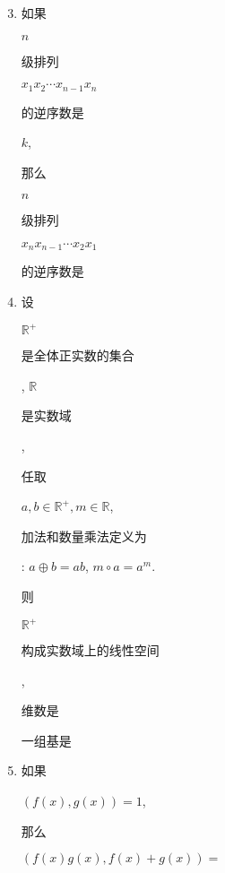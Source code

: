 \documentclass[10pt]{article}
\begin{document}
\begin{enumerate}
  \setcounter{enumi}{2}
  \item \begin{CJK}{UTF8}{mj}如果\end{CJK} $n$ \begin{CJK}{UTF8}{mj}级排列\end{CJK} $x_{1} x_{2} \cdots x_{n-1} x_{n}$ \begin{CJK}{UTF8}{mj}的逆序数是\end{CJK} $k$, \begin{CJK}{UTF8}{mj}那么\end{CJK} $n$ \begin{CJK}{UTF8}{mj}级排列\end{CJK} $x_{n} x_{n-1} \cdots x_{2} x_{1}$ \begin{CJK}{UTF8}{mj}的逆序数是\end{CJK}

  \item \begin{CJK}{UTF8}{mj}设\end{CJK} $\mathbb{R}^{+}$\begin{CJK}{UTF8}{mj}是全体正实数的集合\end{CJK}, $\mathbb{R}$ \begin{CJK}{UTF8}{mj}是实数域\end{CJK}, \begin{CJK}{UTF8}{mj}任取\end{CJK} $a, b \in \mathbb{R}^{+}, m \in \mathbb{R}$, \begin{CJK}{UTF8}{mj}加法和数量乘法定义为\end{CJK}: $a \oplus b=a b$, $m \circ a=a^{m}$. \begin{CJK}{UTF8}{mj}则\end{CJK} $\mathbb{R}^{+}$\begin{CJK}{UTF8}{mj}构成实数域上的线性空间\end{CJK}, \begin{CJK}{UTF8}{mj}维数是\end{CJK} \begin{CJK}{UTF8}{mj}一组基是\end{CJK}

  \item \begin{CJK}{UTF8}{mj}如果\end{CJK} $(f(x), g(x))=1$, \begin{CJK}{UTF8}{mj}那么\end{CJK} $(f(x) g(x), f(x)+g(x))=$


\end{enumerate}
\end{document}
